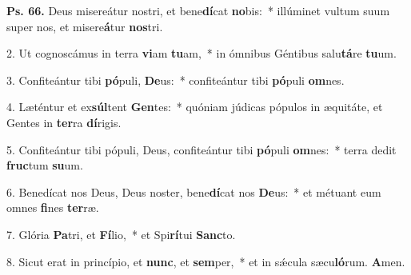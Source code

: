 \textbf{Ps. 66.} Deus misereátur nostri, et bene\textbf{dí}cat \textbf{no}bis:~* illúminet vultum suum super nos, et misere\textbf{á}tur \textbf{nos}tri.

2. Ut cognoscámus in terra \textbf{vi}am \textbf{tu}am,~* in ómnibus Géntibus salu\textbf{tá}re \textbf{tu}um.

3. Confiteántur tibi \textbf{pó}puli, \textbf{De}us:~* confiteántur tibi \textbf{pó}puli \textbf{om}nes.

4. Læténtur et ex\textbf{súl}tent \textbf{Gen}tes:~* quóniam júdicas pópulos in æquitáte, et Gentes in \textbf{ter}ra \textbf{dí}rigis.

5. Confiteántur tibi pópuli, Deus, confiteántur tibi \textbf{pó}puli \textbf{om}nes:~* terra dedit \textbf{fruc}tum \textbf{su}um.

6. Benedícat nos Deus, Deus noster, bene\textbf{dí}cat nos \textbf{De}us:~* et métuant eum omnes \textbf{fi}nes \textbf{ter}ræ.

7. Glória \textbf{Pa}tri, et \textbf{Fí}lio,~* et Spi\textbf{rí}tui \textbf{Sanc}to.

8. Sicut erat in princípio, et \textbf{nunc}, et \textbf{sem}per,~* et in s\'{\ae}cula sæcu\textbf{ló}rum. \textbf{A}men.